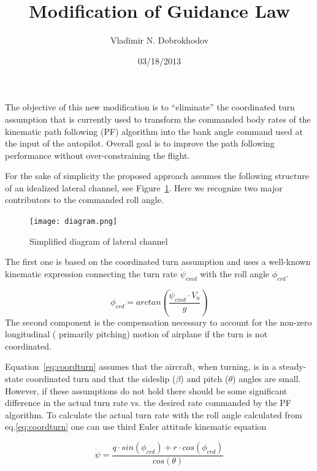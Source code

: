 \documentclass[]{article}
\begin{document}
\title{Modification of Guidance Law}
\author{Vladimir N. Dobrokhodov}
\date{03/18/2013}
\maketitle

The objective of this new modification is to ``eliminate'' the coordinated turn assumption that is currently used to transform the commanded body rates of the kinematic path following (PF) algorithm into the bank angle command used at the input of the autopilot. Overall goal is to improve the path following performance without over-constraining the flight.

For the sake of simplicity the proposed approach assumes the following structure of an idealized lateral channel, see Figure~\ref{fig:LatAP}. Here we recognize two major contributors to the commanded roll angle. 
 
\begin{figure}[thpb]
      \centering
      \texttt{[image: diagram.png]}
      \caption{Simplified diagram of lateral channel}
      \label{fig:LatAP}
   \end{figure}
The first one is based on the coordinated turn assumption and uses a well-known kinematic expression connecting the turn rate $\dot{\psi}_{cmd}$ with the roll angle $\phi_{crd}$. 

\begin{equation}
\label{eq:coordturn}
	\phi_{crd}=arctan( \frac { \dot{\psi}_{cmd} \cdot V_a} {g})	
\end{equation}
The second component is the compensation necessary to account for the non-zero longitudinal ( primarily pitching) motion of airplane if the turn is not coordinated.

Equation~\ref{eq:coordturn} assumes that the aircraft, when turning, is in a steady-state coordinated turn and that the sideslip ($\beta$) and pitch ($\theta$) angles are small. However, if these assumptions do not hold there should be some significant difference in the actual turn rate vs. the desired rate commanded by the PF algorithm.  To calculate the actual turn rate with the roll angle calculated from eq.\ref{eq:coordturn} one can use third Euler attitude kinematic equation

\begin{equation}
\label{eq:psidot}
	\dot{\psi}=\frac {q \cdot sin(\phi_{crd})+ r \cdot cos(\phi_{crd})} {cos(\theta)}	
\end{equation}
\end{document}
